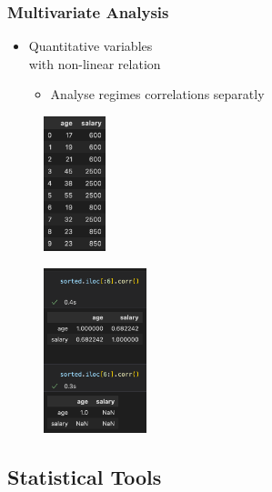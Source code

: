\begin{frame}\frametitle{Multivariate Analysis}
   \begin{minipage}{0.48\linewidth}
      \begin{itemize}
         \item Quantitative variables\\
               with non-linear relation
         \begin{itemize}
            \item Analyse regimes correlations separatly
         \end{itemize}
      \end{itemize}
      \begin{figure}[H]
         \includegraphics[width=1.8cm]{../images/illustrations/pattern_multivariate_quantitative_non_linear_df.png}
      \end{figure}
   \end{minipage}
   \begin{minipage}{0.48\linewidth}
      \begin{figure}[H]
         \includegraphics[width=3cm]{../images/illustrations/pattern_multivariate_quantitative_non_linear_corr_pearson_split.png}
      \end{figure}
   \end{minipage}
\end{frame}

\subsection{Statistical Tools}


